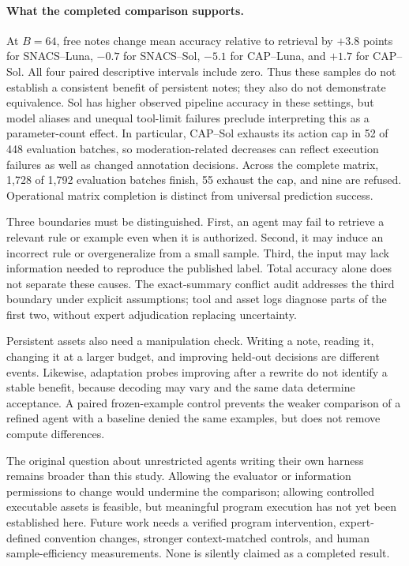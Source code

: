 \documentclass[11pt]{article}
\begin{document}
\paragraph{What the completed comparison supports.}
At $B=64$, free notes change mean accuracy relative to retrieval by $+3.8$ points for SNACS--Luna, $-0.7$ for SNACS--Sol, $-5.1$ for CAP--Luna, and $+1.7$ for CAP--Sol. All four paired descriptive intervals include zero. Thus these samples do not establish a consistent benefit of persistent notes; they also do not demonstrate equivalence. Sol has higher observed pipeline accuracy in these settings, but model aliases and unequal tool-limit failures preclude interpreting this as a parameter-count effect. In particular, CAP--Sol exhausts its action cap in 52 of 448 evaluation batches, so moderation-related decreases can reflect execution failures as well as changed annotation decisions. Across the complete matrix, 1,728 of 1,792 evaluation batches finish, 55 exhaust the cap, and nine are refused. Operational matrix completion is distinct from universal prediction success.

Three boundaries must be distinguished. First, an agent may fail to retrieve a relevant rule or example even when it is authorized. Second, it may induce an incorrect rule or overgeneralize from a small sample. Third, the input may lack information needed to reproduce the published label. Total accuracy alone does not separate these causes. The exact-summary conflict audit addresses the third boundary under explicit assumptions; tool and asset logs diagnose parts of the first two, without expert adjudication replacing uncertainty.

Persistent assets also need a manipulation check. Writing a note, reading it, changing it at a larger budget, and improving held-out decisions are different events. Likewise, adaptation probes improving after a rewrite do not identify a stable benefit, because decoding may vary and the same data determine acceptance. A paired frozen-example control prevents the weaker comparison of a refined agent with a baseline denied the same examples, but does not remove compute differences.

The original question about unrestricted agents writing their own harness remains broader than this study. Allowing the evaluator or information permissions to change would undermine the comparison; allowing controlled executable assets is feasible, but meaningful program execution has not yet been established here. Future work needs a verified program intervention, expert-defined convention changes, stronger context-matched controls, and human sample-efficiency measurements. None is silently claimed as a completed result.
\end{document}
